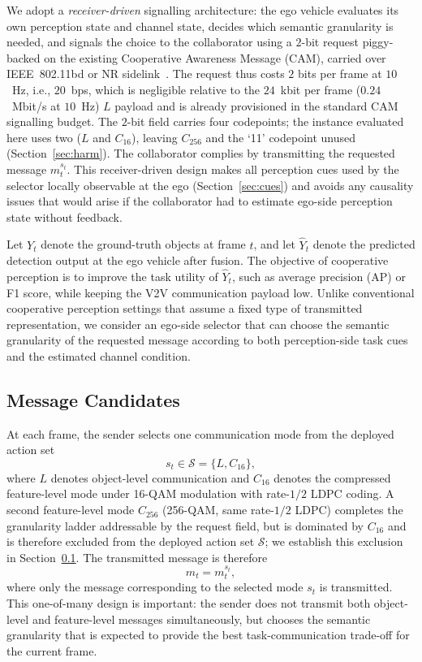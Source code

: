 \documentclass[journal]{IEEEtran}
\begin{document}
We adopt a \emph{receiver-driven} signalling architecture: the ego vehicle evaluates its own perception state and channel state, decides which semantic granularity is needed, and signals the choice to the collaborator using a $2$-bit request piggy-backed on the existing Cooperative Awareness Message (CAM), carried over IEEE~802.11bd or NR sidelink~\cite{ieee80211bd}. The request thus costs $2$ bits per frame at $10$~Hz, i.e., $20$~bps, which is negligible relative to the $24$~kbit per frame ($0.24$~Mbit/s at $10$~Hz) $L$ payload and is already provisioned in the standard CAM signalling budget. The $2$-bit field carries four codepoints; the instance evaluated here uses two ($L$ and $C_{16}$), leaving $C_{256}$ and the `11' codepoint unused (Section~\ref{sec:harm}). The collaborator complies by transmitting the requested message $m_t^{s_t}$. This receiver-driven design makes all perception cues used by the selector locally observable at the ego (Section~\ref{sec:cues}) and avoids any causality issues that would arise if the collaborator had to estimate ego-side perception state without feedback.

Let $Y_t$ denote the ground-truth objects at frame $t$, and let $\hat{Y}_t$ denote the predicted detection output at the ego vehicle after fusion. The objective of cooperative perception is to improve the task utility of $\hat{Y}_t$, such as average precision (AP) or F1 score, while keeping the V2V communication payload low. Unlike conventional cooperative perception settings that assume a fixed type of transmitted representation, we consider an ego-side selector that can choose the semantic granularity of the requested message according to both perception-side task cues and the estimated channel condition.

\subsection{Message Candidates}\label{sec:candidates}

At each frame, the sender selects one communication mode from the deployed action set
\begin{equation}
s_t \in \mathcal{S} = \{L, C_{16}\},
\label{eq:action_set}
\end{equation}
where $L$ denotes object-level communication and $C_{16}$ denotes the compressed feature-level mode under 16-QAM modulation with rate-$1/2$ LDPC coding. A second feature-level mode $C_{256}$ (256-QAM, same rate-$1/2$ LDPC) completes the granularity ladder addressable by the request field, but is dominated by $C_{16}$ and is therefore excluded from the deployed action set $\mathcal{S}$; we establish this exclusion in Section~\ref{sec:candidates}. The transmitted message is therefore
\begin{equation}
m_t = m_t^{s_t},
\end{equation}
where only the message corresponding to the selected mode $s_t$ is transmitted. This one-of-many design is important: the sender does not transmit both object-level and feature-level messages simultaneously, but chooses the semantic granularity that is expected to provide the best task-communication trade-off for the current frame.
\end{document}
